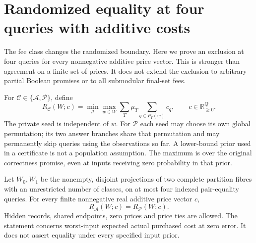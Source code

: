 \section{Randomized equality at four queries with additive costs}
\label{sec:four-additive}
The fee class changes the randomized boundary. Here we prove an exclusion
at four queries for every nonnegative additive price vector. This is
stronger than agreement on a finite set of prices. It does not extend
the exclusion to arbitrary partial Boolean promises or to all submodular
final-set fees.

For $\mathcal C\in\{\mathcal A,\mathcal P\}$, define
\[
 R_{\mathcal C}(W;c)=\min_{\mu}\max_{w\in W}
   \sum_T\mu_T\sum_{q\in P_T(w)}c_q,\qquad c\in\mathbb R_{\geq0}^{Q}.
\]
The private seed is independent of $w$. For $\mathcal P$ each seed may
choose its own global permutation; its two answer branches share that
permutation and may permanently skip queries using the observations so
far. A lower-bound prior used in a certificate is not a population
assumption. The maximum is over the original correctness promise, even
at inputs receiving zero probability in that prior.

\begin{theorem}
\label{thm:four-additive}
Let $W_0,W_1$ be the nonempty, disjoint projections of two complete
partition fibres with an unrestricted number of classes, on at most
four indexed pair-equality queries. For every finite nonnegative real
additive price vector $c$,
\[
 R_{\mathcal A}(W;c)=R_{\mathcal P}(W;c).
\]
Hidden records, shared endpoints, zero prices and price ties are allowed.
The statement concerns worst-input expected actual purchased cost at
zero error. It does not assert equality under every specified input prior.
\end{theorem}

